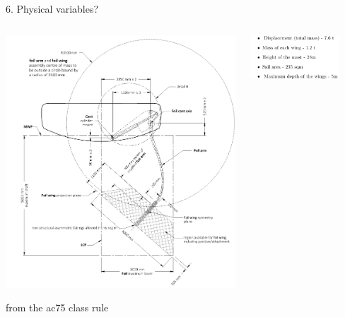 \documentclass[presentation,aspectratio=169]{beamer}
\begin{document}
\begin{frame}[label={sec:orgd30c454}]{6. Physical variables?}
\begin{columns}
\begin{column}{0.5\columnwidth}
\begin{center}
\includegraphics[height=0.8\textheight]{../../figures/ac75-class-foil.png}
\end{center}

{\footnotesize from the ac75 class rule}
\end{column}
\begin{column}{0.5\columnwidth}
\begin{center}
\includegraphics[width=0.8\textwidth]{../../figures/parameters}
\end{center}
\end{column}
\end{columns}
\end{frame}
\end{document}
